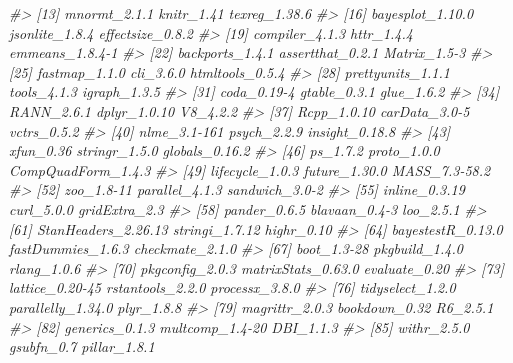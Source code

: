 \documentclass[
  man,floatsintext]{apa6}
\newenvironment{Shaded}{\begin{snugshade}}{\end{snugshade}}
\newcommand{\CommentTok}[1]{\textcolor[rgb]{0.56,0.35,0.01}{\textit{#1}}}
\begin{document}
\begin{Shaded}
\begin{Highlighting}[]
\CommentTok{\#\textgreater{}  [13] mnormt\_2.1.1          knitr\_1.41            texreg\_1.38.6        }
\CommentTok{\#\textgreater{}  [16] bayesplot\_1.10.0      jsonlite\_1.8.4        effectsize\_0.8.2     }
\CommentTok{\#\textgreater{}  [19] compiler\_4.1.3        httr\_1.4.4            emmeans\_1.8.4{-}1      }
\CommentTok{\#\textgreater{}  [22] backports\_1.4.1       assertthat\_0.2.1      Matrix\_1.5{-}3         }
\CommentTok{\#\textgreater{}  [25] fastmap\_1.1.0         cli\_3.6.0             htmltools\_0.5.4      }
\CommentTok{\#\textgreater{}  [28] prettyunits\_1.1.1     tools\_4.1.3           igraph\_1.3.5         }
\CommentTok{\#\textgreater{}  [31] coda\_0.19{-}4           gtable\_0.3.1          glue\_1.6.2           }
\CommentTok{\#\textgreater{}  [34] RANN\_2.6.1            dplyr\_1.0.10          V8\_4.2.2             }
\CommentTok{\#\textgreater{}  [37] Rcpp\_1.0.10           carData\_3.0{-}5         vctrs\_0.5.2          }
\CommentTok{\#\textgreater{}  [40] nlme\_3.1{-}161          psych\_2.2.9           insight\_0.18.8       }
\CommentTok{\#\textgreater{}  [43] xfun\_0.36             stringr\_1.5.0         globals\_0.16.2       }
\CommentTok{\#\textgreater{}  [46] ps\_1.7.2              proto\_1.0.0           CompQuadForm\_1.4.3   }
\CommentTok{\#\textgreater{}  [49] lifecycle\_1.0.3       future\_1.30.0         MASS\_7.3{-}58.2        }
\CommentTok{\#\textgreater{}  [52] zoo\_1.8{-}11            parallel\_4.1.3        sandwich\_3.0{-}2       }
\CommentTok{\#\textgreater{}  [55] inline\_0.3.19         curl\_5.0.0            gridExtra\_2.3        }
\CommentTok{\#\textgreater{}  [58] pander\_0.6.5          blavaan\_0.4{-}3         loo\_2.5.1            }
\CommentTok{\#\textgreater{}  [61] StanHeaders\_2.26.13   stringi\_1.7.12        highr\_0.10           }
\CommentTok{\#\textgreater{}  [64] bayestestR\_0.13.0     fastDummies\_1.6.3     checkmate\_2.1.0      }
\CommentTok{\#\textgreater{}  [67] boot\_1.3{-}28           pkgbuild\_1.4.0        rlang\_1.0.6          }
\CommentTok{\#\textgreater{}  [70] pkgconfig\_2.0.3       matrixStats\_0.63.0    evaluate\_0.20        }
\CommentTok{\#\textgreater{}  [73] lattice\_0.20{-}45       rstantools\_2.2.0      processx\_3.8.0       }
\CommentTok{\#\textgreater{}  [76] tidyselect\_1.2.0      parallelly\_1.34.0     plyr\_1.8.8           }
\CommentTok{\#\textgreater{}  [79] magrittr\_2.0.3        bookdown\_0.32         R6\_2.5.1             }
\CommentTok{\#\textgreater{}  [82] generics\_0.1.3        multcomp\_1.4{-}20       DBI\_1.1.3            }
\CommentTok{\#\textgreater{}  [85] withr\_2.5.0           gsubfn\_0.7            pillar\_1.8.1         }

\end{Highlighting}
\end{Shaded}
\end{document}

